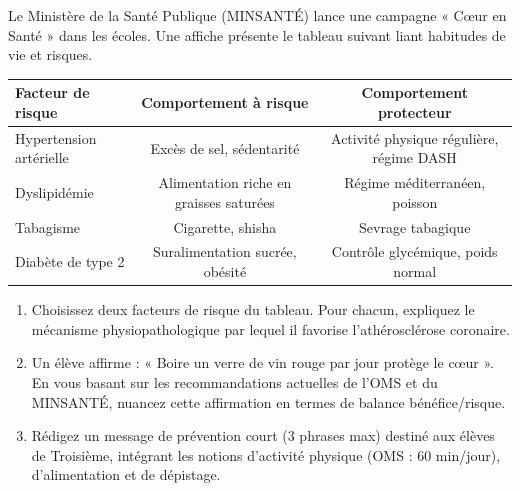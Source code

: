 \documentclass[11pt]{article}
\begin{document}
\begin{exercice}
Le Ministère de la Santé Publique (MINSANTÉ) lance une campagne « Cœur en Santé » dans les écoles. Une affiche présente le tableau suivant liant habitudes de vie et risques.
\begin{center}
\begin{tabular}{|l|c|c|}
\hline
\textbf{Facteur de risque} & \textbf{Comportement à risque} & \textbf{Comportement protecteur} \\
\hline
Hypertension artérielle & Excès de sel, sédentarité & Activité physique régulière, régime DASH \\
\hline
Dyslipidémie & Alimentation riche en graisses saturées & Régime méditerranéen, poisson \\
\hline
Tabagisme & Cigarette, shisha & Sevrage tabagique \\
\hline
Diabète de type 2 & Suralimentation sucrée, obésité & Contrôle glycémique, poids normal \\
\hline
\end{tabular}
\end{center}
\begin{enumerate}
    \item Choisissez deux facteurs de risque du tableau. Pour chacun, expliquez le mécanisme physiopathologique par lequel il favorise l'athérosclérose coronaire.
    \item Un élève affirme : « Boire un verre de vin rouge par jour protège le cœur ». En vous basant sur les recommandations actuelles de l'OMS et du MINSANTÉ, nuancez cette affirmation en termes de balance bénéfice/risque.
    \item Rédigez un message de prévention court (3 phrases max) destiné aux élèves de Troisième, intégrant les notions d'activité physique (OMS : 60 min/jour), d'alimentation et de dépistage.
\end{enumerate}
\end{exercice}
\end{document}
